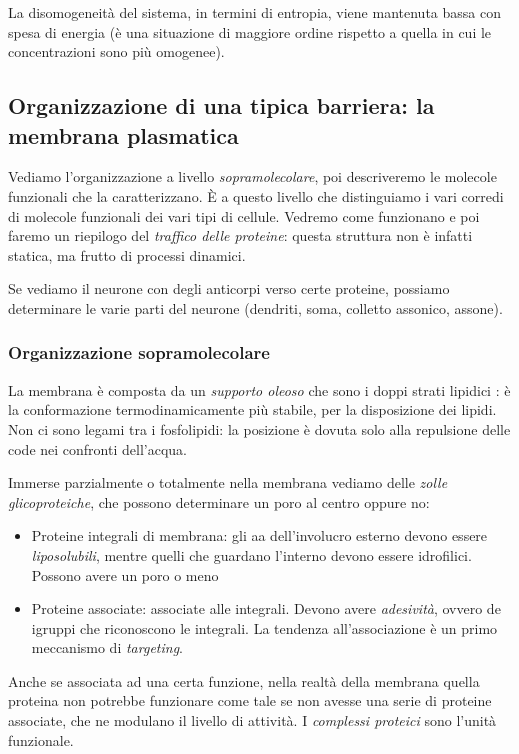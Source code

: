 \documentclass[a4paper,12pt]{article}
\begin{document}
La disomogeneità del sistema, in termini di entropia, viene mantenuta bassa con spesa di energia (è una situazione di maggiore ordine rispetto a quella in cui le concentrazioni sono più omogenee).


\subsection{Organizzazione di una tipica barriera: la membrana plasmatica}
Vediamo l'organizzazione a livello \emph{sopramolecolare}, poi descriveremo le molecole funzionali che la caratterizzano. È a questo livello che distinguiamo i vari corredi di molecole funzionali dei vari tipi di cellule. Vedremo come funzionano e poi faremo un riepilogo del \emph{traffico delle proteine}: questa struttura non è infatti statica, ma frutto di processi dinamici.

Se vediamo il neurone con degli anticorpi verso certe proteine, possiamo determinare le varie parti del neurone (dendriti, soma, colletto assonico, assone).

\subsubsection{Organizzazione sopramolecolare}
La membrana è composta da un \emph{supporto oleoso} che sono i doppi strati lipidici : è la conformazione termodinamicamente più stabile, per la disposizione dei lipidi. Non ci sono legami tra i fosfolipidi: la posizione è dovuta solo alla repulsione delle code nei confronti dell'acqua.

Immerse parzialmente o totalmente nella membrana vediamo delle \emph{zolle glicoproteiche}, che possono determinare un poro al centro oppure no:
\begin{itemize}
\item{Proteine integrali di membrana: gli aa dell'involucro esterno devono essere \emph{liposolubili}, mentre quelli che guardano l'interno devono essere idrofilici. Possono avere un poro o meno}
\item{Proteine associate: associate alle integrali. Devono avere \emph{adesività}, ovvero de igruppi che riconoscono le integrali. La tendenza all'associazione è un primo meccanismo di \emph{targeting}.}
\end{itemize}

Anche se associata ad una certa funzione, nella realtà della membrana quella proteina non potrebbe funzionare come tale se non avesse una serie di proteine associate, che ne modulano il livello di attività. I \emph{complessi proteici} sono l'unità funzionale.
\end{document}
